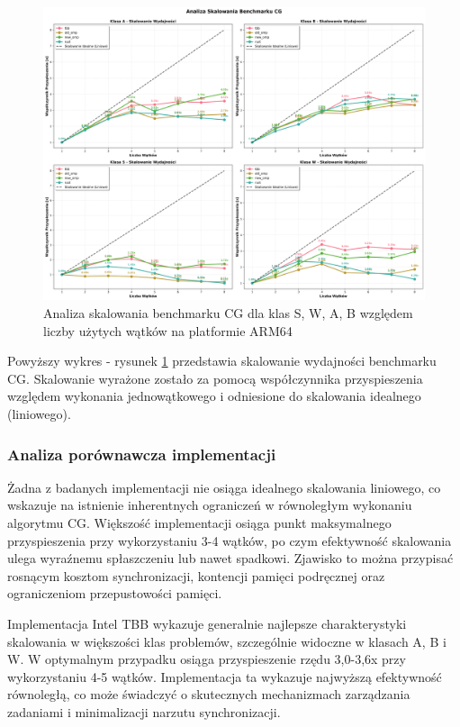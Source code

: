 \begin{figure}[H]
    \centering
    \includegraphics[width=\textwidth]{analiza/images/parallel/cg/arm/cg_analiza_skalowania.png}
    \caption{Analiza skalowania benchmarku CG dla klas S, W, A, B względem liczby użytych wątków na platformie ARM64}
    \label{cg_analiza_skalowania}
\end{figure}
Powyższy wykres - rysunek \ref{cg_analiza_skalowania} przedstawia skalowanie wydajności benchmarku CG. Skalowanie wyrażone zostało za pomocą współczynnika przyspieszenia względem wykonania jednowątkowego i odniesione do skalowania idealnego (liniowego).

\subsubsection{Analiza porównawcza implementacji}
Żadna z badanych implementacji nie osiąga idealnego skalowania liniowego, co wskazuje na istnienie inherentnych ograniczeń w równoległym wykonaniu algorytmu CG. Większość implementacji osiąga punkt maksymalnego przyspieszenia przy wykorzystaniu 3-4 wątków, po czym efektywność skalowania ulega wyraźnemu spłaszczeniu lub nawet spadkowi. Zjawisko to można przypisać rosnącym kosztom synchronizacji, kontencji pamięci podręcznej oraz ograniczeniom przepustowości pamięci.

Implementacja Intel TBB wykazuje generalnie najlepsze charakterystyki skalowania w większości klas problemów, szczególnie widoczne w klasach A, B i W. W optymalnym przypadku osiąga przyspieszenie rzędu 3,0-3,6x przy wykorzystaniu 4-5 wątków. Implementacja ta wykazuje najwyższą efektywność równoległą, co może świadczyć o skutecznych mechanizmach zarządzania zadaniami i minimalizacji narzutu synchronizacji.

